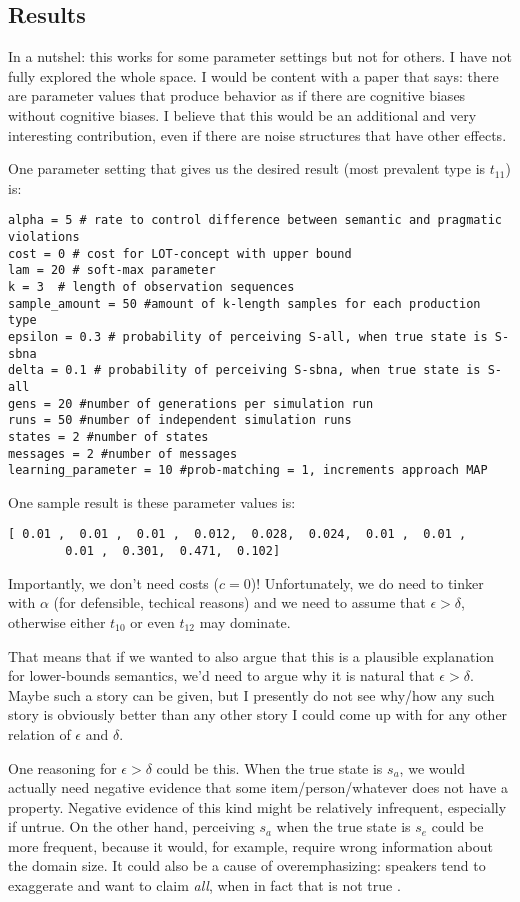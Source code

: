 \documentclass[fleqn,reqno,10pt]{article}
\begin{document}
\subsection*{Results}

In a nutshel: this works for some parameter settings but not for others. I have not fully
explored the whole space. I would be content with a paper that says: there are parameter values
that produce behavior as if there are cognitive biases without cognitive biases. I believe that
this would be an additional and very interesting contribution, even if there are noise
structures that have other effects.

One parameter setting that gives us the desired result (most prevalent type is $t_{11}$) is:
\begin{verbatim}
alpha = 5 # rate to control difference between semantic and pragmatic violations
cost = 0 # cost for LOT-concept with upper bound
lam = 20 # soft-max parameter
k = 3  # length of observation sequences
sample_amount = 50 #amount of k-length samples for each production type
epsilon = 0.3 # probability of perceiving S-all, when true state is S-sbna
delta = 0.1 # probability of perceiving S-sbna, when true state is S-all
gens = 20 #number of generations per simulation run
runs = 50 #number of independent simulation runs
states = 2 #number of states
messages = 2 #number of messages
learning_parameter = 10 #prob-matching = 1, increments approach MAP
\end{verbatim}
One sample result is these parameter values is:
\begin{verbatim}
[ 0.01 ,  0.01 ,  0.01 ,  0.012,  0.028,  0.024,  0.01 ,  0.01 ,
        0.01 ,  0.301,  0.471,  0.102]
\end{verbatim}
Importantly, we don't need costs ($c = 0$)! Unfortunately, we do
need to tinker with $\alpha$ (for defensible, techical reasons) and we need to assume that
$\epsilon > \delta$, otherwise either $t_{10}$ or even $t_{12}$ may dominate. 

That means that if we wanted to also argue that this is a plausible explanation for
lower-bounds semantics, we'd need to argue why it is natural that $\epsilon > \delta$. Maybe
such a story can be given, but I presently do not see why/how any such story is obviously
better than any other story I could come up with for any other relation of $\epsilon$ and
$\delta$. 

One reasoning for $\epsilon > \delta$ could be this. When the true state is $s_a$, we would
actually need negative evidence that some item/person/whatever does not have a
property. Negative evidence of this kind might be relatively infrequent, especially if
untrue. On the other hand, perceiving $s_a$ when the true state is $s_e$ could be more
frequent, because it would, for example, require wrong information about the domain size. It
could also be a cause of overemphasizing: speakers tend to exaggerate and want to claim
\emph{all}, when in fact that is not true \citep[e.g.][for a model that has the speakers'
tendency to overemphasize as a motor of language change]{Schaden2012:Modelling-the-A}.

\printbibliography[heading=bibintoc]
\end{document}
